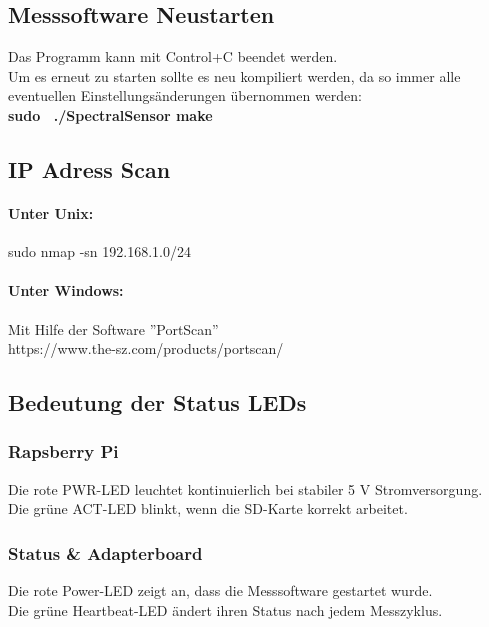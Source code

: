 \subsection{Messsoftware Neustarten}
\label{restart}
Das Programm kann mit Control+C beendet werden.\\
Um es erneut zu starten sollte es neu kompiliert werden, da so immer alle eventuellen Einstellungsänderungen übernommen werden:\\
\textbf{sudo ~./SpectralSensor make}\\




\subsection{IP Adress Scan}
\paragraph{Unter Unix:} sudo nmap -sn 192.168.1.0/24  
\paragraph{Unter Windows:} Mit Hilfe der Software ''PortScan'' \\https://www.the-sz.com/products/portscan/\smallskip

\subsection{Bedeutung der Status LEDs}\label{leds}
\subsubsection{Rapsberry Pi}
Die rote PWR-LED leuchtet kontinuierlich bei stabiler 5 V Stromversorgung.\\
Die grüne ACT-LED blinkt, wenn die SD-Karte korrekt arbeitet.
\subsubsection{Status \& Adapterboard}
Die rote Power-LED zeigt an, dass die Messsoftware gestartet wurde.\\
Die grüne Heartbeat-LED ändert ihren Status nach jedem Messzyklus.\\


